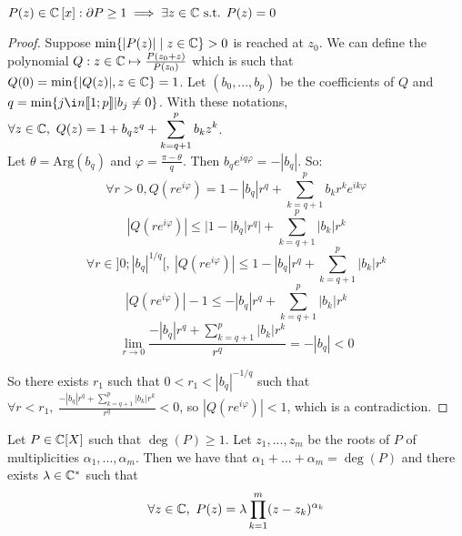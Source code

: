 \begin{theorem}[of d'Alembert]
	$P(z) \in \mathbb{C}\left[ x \right]: \partial P \geq 1 \implies \exists z \in \mathbb{C} \text{ s.t. } P(z)=0$
\end{theorem}
\begin{proof}
	Suppose $\min\{ | P(z) | \mid z \in \mathbb{C} \}>0$ is reached at $z_0$.
	We can define the polynomial $Q:z\in \mathbb{C} \mapsto \frac{P(z_0+z)}{P(z_0)}$ which is such that $Q(0) = \min\{|Q(z)|,z\in \mathbb{C}\} = 1 $.
	Let $(b_0,...,b_p)$ be the coefficients of $Q$ and $q = \min\{ j \i n\llbracket 1;p \rrbracket | b_j\neq 0\}$.
	With these notations, $\forall z\in \mathbb{C},~Q(z) = 1+b_qz^q + \displaystyle \sum_{k = q+1}^pb_kz^k$.\\
	Let $\theta = \mathrm{Arg}(b_q)$ and $\varphi = \frac{\pi-\theta}{q}$.
	Then $b_qe^{iq\varphi} =-|b_q|$.
	So:
	$$\forall r >0, Q(re^{i\varphi}) = 1-|b_q|r^q + \sum_{k = q+1}^p b_k r^k e^{ik\varphi}$$
	$$|Q(re^{i\varphi})| \leq |1-|b_q|r^q| + \sum_{k=q+1}^p |b_k|r^k$$
	$$\forall r \in ]0;|b_q|^{1/q}[,~ |Q(re^{i\varphi})|\leq 1-|b_q|r^q+ \sum_{k=q+1}^p |b_k|r^k$$
	$$|Q(re^{i\varphi})|-1\leq -|b_q|r^q+ \sum_{k=q+1}^p |b_k|r^k$$
	$$\lim_{r\rightarrow 0}\frac{-|b_q| r^q+\sum_{k = q+1}^p|b_k|r^k}{r^q} = -|b_q| <0$$
	
	So there exists $r_1$ such that $0 <r_1<|b_q|^{-1/q}$ such that $\forall r< r_1,~\displaystyle \frac{-|b_q| r^q+\sum_{k = q+1}^p|b_k|r^k}{r^q} <0$, so $|Q(re^{i\varphi})|<1$, which is a contradiction.
\end{proof}

\begin{corollary}
	Let $P\in \mathbb{C}[X]$ such that $\deg(P) \geq 1$. Let $z_1,...,z_m$ be the roots of $P$ of multiplicities $\alpha_1,...,\alpha_m$. Then we have that $\alpha_1+...+\alpha_m = \deg(P)$ and there exists $\lambda\in \mathbb{C}^*$ such that
	$$\forall z\in \mathbb{C},~P(z) = \lambda \prod_{k = 1}^m(z-z_k)^{\alpha_k}$$
\end{corollary}
